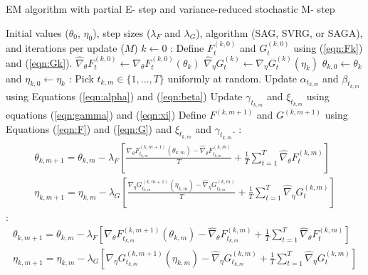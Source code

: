 \begin{algorithm}
\caption{EM algorithm with partial E- step and variance-reduced stochastic M- step}\label{alg:P-EM-SO}
\begin{algorithmic}[1]
\Require Initial values ($\theta_{0}$, $\eta_{0}$), step sizes ($\lambda_F$ and $\lambda_G$), algorithm (SAG, SVRG, or SAGA), and iterations per update ($M$)
%
\State $k \gets 0$
%
:
    \State Define $F_t^{(k,0)}$ and $G_t^{(k,0)}$ using (\ref{eqn:Fk}) and (\ref{eqn:Gk}). 
    \State $\widehat \nabla_\theta F_t^{(k,0)} \gets \nabla_\theta F_t^{(k,0)} (\theta_k)$
    \State $\widehat \nabla_\eta G_t^{(k)} \gets \nabla_\eta G_t^{(k)} (\eta_k)$ 
\EndFor
%
\State $\theta_{k,0} \gets \theta_k$ and $\eta_{k,0} \gets \eta_k$
%
:
    \State Pick $t_{k,m} \in \{1,\ldots,T\}$ uniformly at random.
    \State Update $\alpha_{t_{k,m}}$ and $\beta_{t_{k,m}}$ using Equations (\ref{eqn:alpha}) and (\ref{eqn:beta})
    \State Update $\gamma_{t_{k,m}}$ and $\xi_{t_{k,m}}$ using equations (\ref{eqn:gamma}) and (\ref{eqn:xi})
    \State Define $F^{(k,m+1)}$ and $G^{(k,m+1)}$ using Equations (\ref{eqn:F}) and (\ref{eqn:G}) and $\xi_{t_{k,m}}$ and $\gamma_{t_{k,m}}$.
    :
        \begin{gather}
            \theta_{k,m+1} = \theta_{k,m} - \lambda_F \left[\frac{\nabla_\theta F_{t_{k,m}}^{(k,m+1)}(\theta_{k,m}) - \widehat \nabla_\theta F_{t_{k,m}}^{(k,m)}}{T} + \frac{1}{T} \sum_{t=1}^T \widehat \nabla_\theta F^{(k,m)}_{t} \right] \\
            \eta_{k,m+1} = \eta_{k,m} - \lambda_G \left[\frac{\nabla_\eta G_{t_{k,m}}^{(k,m+1)}(\eta_{k,m}) - \widehat \nabla_\eta G_{t_{k,m}}^{(k,m)}}{T} + \frac{1}{T} \sum_{t=1}^T \widehat \nabla_\eta G^{(k,m)}_{t} \right]
        \end{gather}
    :
        \begin{gather}
            \theta_{k,m+1} = \theta_{k,m} - \lambda_F \left[\nabla_\theta F_{t_{k,m}}^{(k,m+1)}(\theta_{k,m}) - \widehat \nabla_\theta F_{t_{k,m}}^{(k,m)} + \frac{1}{T} \sum_{t=1}^T \widehat \nabla_\theta F^{(k,m)}_{t} \right] \\
            \eta_{k,m+1} = \eta_{k,m} - \lambda_G \left[\nabla_\eta G_{t_{k,m}}^{(k,m+1)}(\eta_{k,m}) - \widehat \nabla_\eta G_{t_{k,m}}^{(k,m)} + \frac{1}{T} \sum_{t=1}^T \widehat \nabla_\eta G^{(k,m)}_{t} \right]

\end{gather}
\end{algorithmic}
\end{algorithm}
